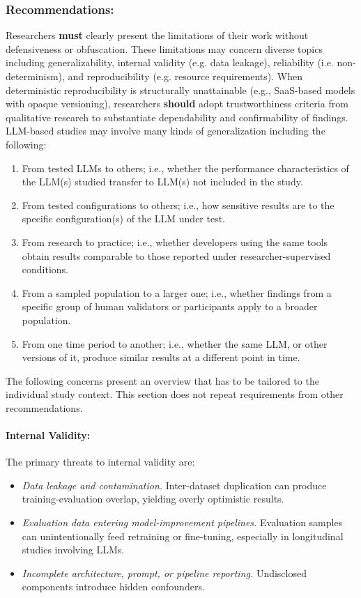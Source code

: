 \documentclass[smallextended]{svjour3}
\newcommand{\must}{\textbf{must}\xspace}
\newcommand{\should}{\textbf{should}\xspace}
\newcommand{\guidelinesubsubsection}[1]{\subsubsection{\bfseries #1:}}
\newcommand{\guidelinesubsubsection}[1]{\subsubsection{#1}}
\begin{document}
\guidelinesubsubsection{Recommendations}
Researchers \must clearly present the limitations of their work without defensiveness or obfuscation. These limitations may concern diverse topics including generalizability, internal validity (e.g. data leakage), reliability (i.e. non-determinism), and reproducibility (e.g. resource requirements). 
When deterministic reproducibility is structurally unattainable (e.g., SaaS-based models with opaque versioning), researchers \should adopt trustworthiness criteria from qualitative research to substantiate dependability and confirmability of findings.
LLM-based studies may involve many kinds of generalization including the following:
\begin{enumerate}
    \item From tested LLMs to others; i.e., whether the performance characteristics of the LLM(s) studied transfer to LLM(s) not included in the study.
    \item From tested configurations to others; i.e., how sensitive results are to the specific configuration(s) of the LLM under test.
    \item From research to practice; i.e., whether developers using the same tools obtain results comparable to those reported under researcher-supervised conditions.
    \item From a sampled population to a larger one; i.e., whether findings from a specific group of human validators or participants apply to a broader population.
    \item From one time period to another; i.e., whether the same LLM, or other versions of it, produce similar results at a different point in time.
\end{enumerate}

The following concerns present an overview that has to be tailored to the individual study context. This section does not repeat requirements from other recommendations.

\paragraph{Internal Validity:}
The primary threats to internal validity are:
\begin{itemize}
	\item \emph{Data leakage and contamination.} Inter-dataset duplication can produce training-evaluation overlap, yielding overly optimistic results.
	\item \emph{Evaluation data entering model-improvement pipelines.} Evaluation samples can unintentionally feed retraining or fine-tuning, especially in longitudinal studies involving LLMs.
	\item \emph{Incomplete architecture, prompt, or pipeline reporting.} Undisclosed components introduce hidden confounders.
\end{itemize}
\end{document}
